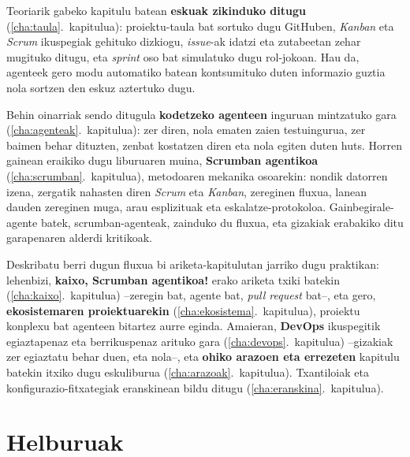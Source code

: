 Teoriarik gabeko kapitulu batean \textbf{eskuak zikinduko ditugu} (\ref{cha:taula}.~kapitulua): proiektu-taula bat sortuko dugu GitHuben, \textit{Kanban} eta \textit{Scrum} ikuspegiak gehituko dizkiogu, \textit{issue}-ak idatzi eta zutabeetan zehar mugituko ditugu, eta \textit{sprint} oso bat simulatuko dugu rol-jokoan.
Hau da, agenteek gero modu automatiko batean kontsumituko duten informazio guztia nola sortzen den eskuz aztertuko dugu.

Behin oinarriak sendo ditugula \textbf{kodetzeko agenteen} inguruan mintzatuko gara (\ref{cha:agenteak}.~kapitulua): zer diren, nola ematen zaien testuingurua, zer baimen behar dituzten, zenbat kostatzen diren eta nola egiten duten huts.
Horren gainean eraikiko dugu liburuaren muina, \textbf{Scrumban agentikoa} (\ref{cha:scrumban}.~kapitulua), metodoaren mekanika osoarekin: nondik datorren izena, zergatik nahasten diren \textit{Scrum} eta \textit{Kanban}, zereginen fluxua, lanean dauden zereginen muga, arau esplizituak eta eskalatze-protokoloa.
Gainbegirale-agente batek, scrumban-agenteak, zainduko du fluxua, eta gizakiak erabakiko ditu garapenaren alderdi kritikoak.

Deskribatu berri dugun fluxua bi ariketa-kapitulutan jarriko dugu praktikan: lehenbizi, \textbf{kaixo, Scrumban agentikoa!} erako ariketa txiki batekin (\ref{cha:kaixo}.~kapitulua) --zeregin bat, agente bat, \textit{pull request} bat--,
eta gero, \textbf{ekosistemaren proiektuarekin} (\ref{cha:ekosistema}.~kapitulua), proiektu konplexu bat agenteen bitartez aurre eginda.
Amaieran, \textbf{DevOps} ikuspegitik egiaztapenaz eta berrikuspenaz arituko gara (\ref{cha:devops}.~kapitulua) --gizakiak zer egiaztatu behar duen, eta nola--, eta \textbf{ohiko arazoen eta errezeten} kapitulu batekin itxiko dugu eskuliburua (\ref{cha:arazoak}.~kapitulua).
Txantiloiak eta konfigurazio-fitxategiak eranskinean bildu ditugu (\ref{cha:eranskina}.~kapitulua).

\section{Helburuak}

